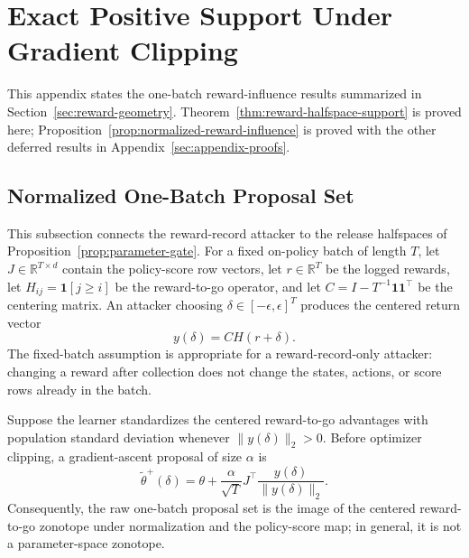 \section{Exact Positive Support Under Gradient Clipping}
\label{sec:appendix-support}

This appendix states the one-batch reward-influence results summarized in
Section~\ref{sec:reward-geometry}.  Theorem~\ref{thm:reward-halfspace-support}
is proved here; Proposition~\ref{prop:normalized-reward-influence} is proved
with the other deferred results in
Appendix~\ref{sec:appendix-proofs}.

\subsection{Normalized One-Batch Proposal Set}

This subsection connects the reward-record attacker to the release halfspaces
of Proposition~\ref{prop:parameter-gate}.  For a
fixed on-policy batch of length $T$, let $J\in\mathbb R^{T\times d}$ contain
the policy-score row vectors, let $r\in\mathbb R^T$ be the logged rewards, let
$H_{ij}=\mathbf 1[j\ge i]$ be the reward-to-go operator, and let
$C=I-T^{-1}\mathbf 1\mathbf 1^\top$ be the centering matrix.  An attacker
choosing $\delta\in[-\epsilon,\epsilon]^T$ produces the centered return
vector
\begin{equation}
y(\delta)=CH(r+\delta).
\label{eq:centered-return}
\end{equation}
The fixed-batch assumption is appropriate for a reward-record-only attacker:
changing a reward after collection does not change the states, actions, or
score rows already in the batch.

\begin{proposition}
\label{prop:normalized-reward-influence}
Suppose the learner standardizes the centered reward-to-go advantages with
population standard deviation whenever $\|y(\delta)\|_2>0$.  Before optimizer
clipping, a gradient-ascent proposal of size $\alpha$ is
\begin{equation}
\widetilde\theta^+(\delta)=\theta+
\frac{\alpha}{\sqrt T}J^\top
\frac{y(\delta)}{\|y(\delta)\|_2}.
\label{eq:normalized-update}
\end{equation}
Consequently, the raw one-batch proposal set is the image of the centered
reward-to-go zonotope under normalization and the policy-score map; in general,
it is not a parameter-space zonotope.
\end{proposition}

